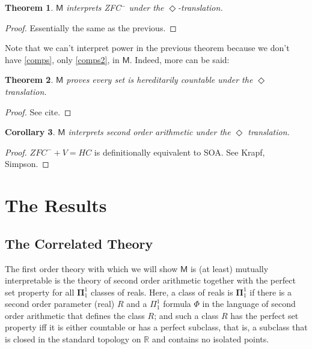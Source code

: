 \documentclass{article}
\newtheorem{Theorem}{Theorem}[section]
\newtheorem{Corollary}[Theorem]{Corollary}
\theoremstyle{definition}
\begin{document}
\begin{Theorem}
    $\mathsf{M}$ interprets ZFC$^-$ under the $\Diamond$-translation.
\end{Theorem}
\begin{proof}
    Essentially the same as the previous. 
\end{proof}
Note that we can't interpret power in the previous theorem because we don't 
have \eqref{comps}, only \eqref{comps2}, in $\mathsf{M}$. Indeed, more
can be said:
\begin{Theorem}\label{hcount}
    $\mathsf{M}$ proves every set is hereditarily countable under the 
    $\Diamond$ translation.
\end{Theorem}
\begin{proof}
    See cite.
\end{proof}
\begin{Corollary}\label{soa}
    $\mathsf{M}$ interprets second order arithmetic under the $\Diamond$ translation.
\end{Corollary}
\begin{proof}
    $ZFC^- + V = HC$ is definitionally equivalent to SOA. See Krapf, Simpson.
\end{proof}

\section{The Results}
\subsection{The Correlated Theory}
The first order theory with which we will show $\mathsf{M}$ is (at least) 
mutually interpretable is the theory of second order arithmetic together with the 
perfect set property for all $\mathbf{\Pi}_1^1$ classes of reals. 
Here, a class of reals is $\mathbf{\Pi}_1^1$ if there is a second order parameter 
(real) $R$ and a $\Pi_1^1$ formula $\Phi$ in the language of second order arithmetic
that defines the class $R$; and such a class $R$ has the perfect set property iff 
it is either countable or has a perfect subclass, that is, a subclass that is closed 
in the standard topology on $\mathbb{R}$ and contains no isolated points. 
\end{document}
